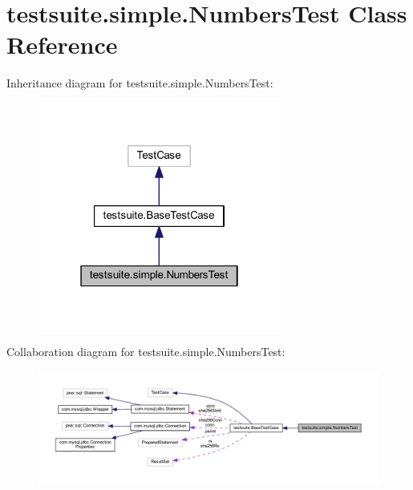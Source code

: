 \hypertarget{classtestsuite_1_1simple_1_1_numbers_test}{}\section{testsuite.\+simple.\+Numbers\+Test Class Reference}
\label{classtestsuite_1_1simple_1_1_numbers_test}


Inheritance diagram for testsuite.\+simple.\+Numbers\+Test\+:
\nopagebreak
\begin{figure}[H]
\begin{center}
\leavevmode
\includegraphics[width=226pt]{classtestsuite_1_1simple_1_1_numbers_test__inherit__graph}
\end{center}
\end{figure}


Collaboration diagram for testsuite.\+simple.\+Numbers\+Test\+:
\nopagebreak
\begin{figure}[H]
\begin{center}
\leavevmode
\includegraphics[width=350pt]{classtestsuite_1_1simple_1_1_numbers_test__coll__graph}
\end{center}
\end{figure}
